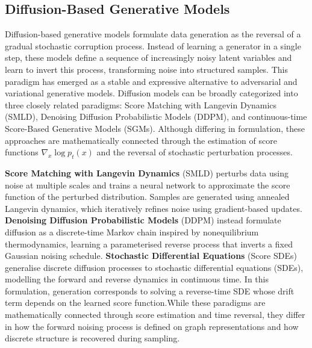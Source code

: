 \subsection{Diffusion-Based Generative Models}
\label{sec:theory:diffusion}

Diffusion-based generative models formulate data generation as the reversal of a
gradual stochastic corruption process. Instead of learning a generator in a
single step, these models define a sequence of increasingly noisy latent
variables and learn to invert this process, transforming noise into structured
samples. This paradigm has emerged as a stable and expressive alternative to
adversarial and variational generative models.
Diffusion models can be broadly categorized into three closely related
paradigms: Score Matching with Langevin Dynamics (SMLD),
Denoising Diffusion Probabilistic Models (DDPM),
and continuous-time Score-Based Generative Models (SGMs).
Although differing in formulation, these approaches are mathematically
connected through the estimation of score functions
$\nabla_x \log p_t(x)$ and the reversal of stochastic perturbation processes.

\textbf{Score Matching with Langevin Dynamics} (SMLD)
\citep{song2019generative}
perturbs data using noise at multiple scales and trains a neural
network to approximate the score function of the perturbed
distribution. Samples are generated using annealed Langevin
dynamics, which iteratively refines noise using gradient-based
updates. \textbf{Denoising Diffusion Probabilistic Models} (DDPM)
\citep{ho2020ddpm} instead formulate diffusion as a discrete-time
Markov chain inspired by nonequilibrium thermodynamics,
learning a parameterised reverse process that inverts a fixed
Gaussian noising schedule. \textbf{Stochastic Differential Equations } (Score SDEs)
\citep{song2020score} generalise discrete diffusion processes
to stochastic differential equations (SDEs), modelling the forward
and reverse dynamics in continuous time.
In this formulation, generation corresponds to solving a reverse-time
SDE whose drift term depends on the learned score function.While these paradigms are mathematically connected through score
estimation and time reversal, they differ in how the forward noising process is
defined on graph representations and how discrete structure is recovered during
sampling.

